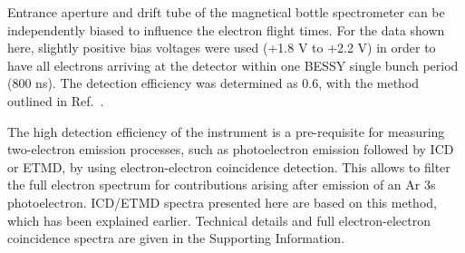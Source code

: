 Entrance aperture and drift tube of the magnetical bottle spectrometer can be independently biased to influence the electron flight times. 
For the data shown here, slightly positive bias voltages were used (+1.8 V to +2.2 V) in order to have all electrons arriving at the detector within one BESSY single bunch period (800 ns). 
The detection efficiency was determined as 0.6, with the method outlined in Ref.\ .

The high detection efficiency of the instrument is a pre-requisite for measuring two-electron emission processes, such as photoelectron emission followed by ICD or ETMD, by using electron-electron coincidence detection. 
This allows to filter the full electron spectrum for contributions arising after emission of an Ar 3s photoelectron.
ICD/ETMD spectra presented here are based on this method, which has been explained earlier.\cite{mucke_review,Foerstel_phd}
Technical details and full electron-electron coincidence spectra are given in the Supporting Information.